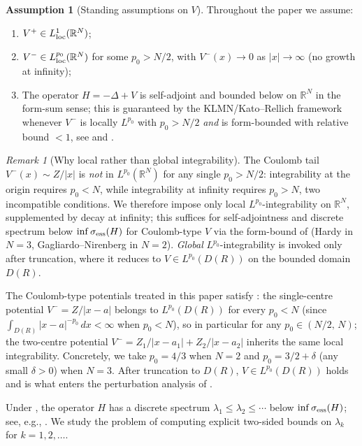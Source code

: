 \documentclass[11pt]{article}
\theoremstyle{plain}
\theoremstyle{definition}
\newtheorem{assumption}{Assumption}
\theoremstyle{remark}
\newtheorem{remark}{Remark}
\newcommand{\R}{\mathbb{R}}
\newcommand{\dx}{\,dx}
\begin{document}
\begin{assumption}[Standing assumptions on $V$]
\label{ass:V}
Throughout the paper we assume:
\begin{enumerate}[label=(\roman*)]
  \item $V^+ \in L^1_{\rm loc}(\R^N)$;
  \item $V^- \in L^{p_0}_{\rm loc}(\R^N)$ for some $p_0 > N/2$,
        with $V^-(x)\to 0$ as $|x|\to\infty$ (no growth at infinity);
  \item The operator $H=-\Delta+V$ is self-adjoint and bounded below on
        $\R^N$ in the form-sum sense; this is guaranteed by the
        KLMN/Kato--Rellich framework whenever $V^-$ is locally
        $L^{p_0}$ with $p_0>N/2$ \emph{and} is form-bounded with
        relative bound $<1$, see
         and \cite[Theorem~X.17]{Reed-Simon}.
\end{enumerate}
\end{assumption}

\begin{remark}[Why local rather than global integrability]
\label{rmk:Lploc-vs-Lp}
The Coulomb tail $V^-(x)\sim Z/|x|$ is \emph{not} in $L^{p_0}(\R^N)$
for any single $p_0>N/2$: integrability at the origin requires
$p_0<N$, while integrability at infinity requires $p_0>N$, two
incompatible conditions. We therefore impose only local
$L^{p_0}$-integrability on $\R^N$, supplemented by decay at infinity;
this suffices for self-adjointness and discrete spectrum below
$\inf\sigma_{\rm ess}(H)$ for Coulomb-type $V$ via the form-bound
of  (Hardy in $N=3$,
Gagliardo--Nirenberg in $N=2$). \emph{Global} $L^{p_0}$-integrability
is invoked only after truncation, where it reduces to
$V\in L^{p_0}(D(R))$ on the bounded domain $D(R)$.
\end{remark}

The Coulomb-type potentials treated in this paper satisfy
: the single-centre potential $V^-=Z/|x-a|$ belongs to
$L^{p_0}(D(R))$ for every $p_0<N$ (since
$\int_{D(R)}|x-a|^{-p_0}\dx<\infty$ when $p_0<N$), so in particular
for any $p_0\in(N/2,\,N)$; the two-centre potential
$V^-=Z_1/|x-a_1|+Z_2/|x-a_2|$ inherits the same local integrability.
Concretely, we take $p_0=4/3$ when $N=2$ and $p_0=3/2+\delta$
(any small $\delta>0$) when $N=3$. After truncation to $D(R)$,
$V\in L^{p_0}(D(R))$ holds and is what enters the perturbation
analysis of .

Under , the operator $H$ has a discrete spectrum
$\lambda_1 \le \lambda_2 \le \cdots$ below
$\inf\sigma_{\rm ess}(H)$; see, e.g., \cite{persson1960bounds}.
We study the problem of computing explicit two-sided bounds on
$\lambda_k$ for $k = 1, 2, \ldots$.
\end{document}

